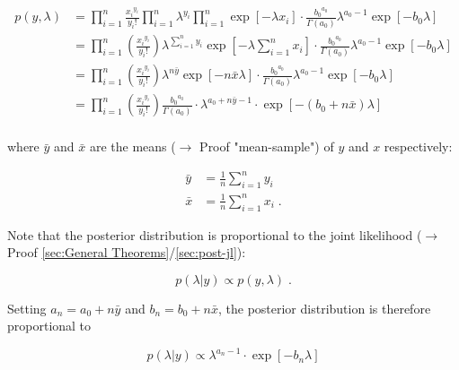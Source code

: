 \documentclass[a4paper,12pt,twoside]{book}
\begin{document}
\begin{equation} \label{eq:poissexp-post-Poiss-JL-s2}
\begin{split}
p(y,\lambda) &= \prod_{i=1}^n \frac{ {x_i}^{y_i}}{y_i !} \prod_{i=1}^n \lambda^{y_i} \prod_{i=1}^n \exp\left[-\lambda x_i\right] \cdot \frac{ {b_0}^{a_0}}{\Gamma(a_0)} \lambda^{a_0-1} \exp[-b_0 \lambda] \\
&= \prod_{i=1}^n \left(\frac{ {x_i}^{y_i}}{y_i !}\right) \lambda^{\sum_{i=1}^n y_i} \exp\left[-\lambda \sum_{i=1}^n x_i\right] \cdot \frac{ {b_0}^{a_0}}{\Gamma(a_0)} \lambda^{a_0-1} \exp[-b_0 \lambda] \\
&= \prod_{i=1}^n \left(\frac{ {x_i}^{y_i}}{y_i !}\right) \lambda^{n \bar{y}} \exp\left[-n \bar{x} \lambda\right] \cdot \frac{ {b_0}^{a_0}}{\Gamma(a_0)} \lambda^{a_0-1} \exp[-b_0 \lambda] \\
&= \prod_{i=1}^n \left(\frac{ {x_i}^{y_i}}{y_i !}\right) \frac{ {b_0}^{a_0}}{\Gamma(a_0)}  \cdot \lambda^{a_0 + n \bar{y} - 1} \cdot \exp\left[-(b_0 + n \bar{x}) \lambda\right] \\
\end{split}
\end{equation}

where $\bar{y}$ and $\bar{x}$ are the means ($\rightarrow$ Proof "mean-sample") of $y$ and $x$ respectively:

\begin{equation} \label{eq:poissexp-post-xy-mean}
\begin{split}
\bar{y} &= \frac{1}{n} \sum_{i=1}^n y_i \\
\bar{x} &= \frac{1}{n} \sum_{i=1}^n x_i \; .
\end{split}
\end{equation}

Note that the posterior distribution is proportional to the joint likelihood ($\rightarrow$ Proof \ref{sec:General Theorems}/\ref{sec:post-jl}):

\begin{equation} \label{eq:poissexp-post-Poiss-exp-post-s1}
p(\lambda|y) \propto p(y,\lambda) \; .
\end{equation}

Setting $a_n = a_0 + n \bar{y}$ and $b_n = b_0 + n \bar{x}$, the posterior distribution is therefore proportional to

\begin{equation} \label{eq:poissexp-post-Poiss-exp-post-s2}
p(\lambda|y) \propto \lambda^{a_n-1} \cdot \exp\left[-b_n \lambda\right]
\end{equation}
\end{document}
